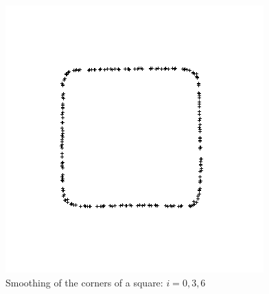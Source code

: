 \documentclass{beamer}
\begin{document}
\begin{frame}
\begin{figure}
        \includegraphics[scale=0.2]{img/square-noisy-3-15-01-6}
        \caption*{Smoothing of the corners of a square: $ i = 0, 3, 6 $}
    \end{figure}
\end{frame}
\end{document}
